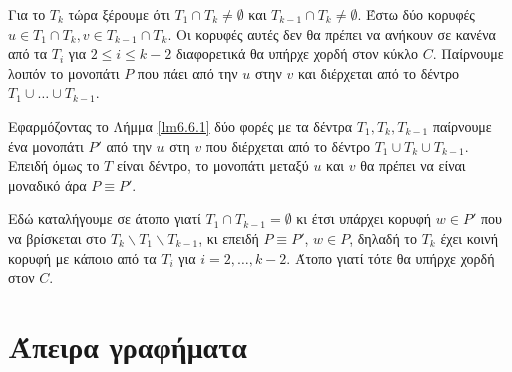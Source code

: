 \documentclass[a4paper, oneside, 11pt]{article}
\theoremstyle{definition}
\begin{document}
\begin{enumerate}
   Για το $T_k$ τώρα ξέρουμε ότι $T_1 \cap T_k \neq \emptyset$
   και $T_{k-1} \cap T_{k} \neq \emptyset$. Έστω δύο κορυφές
   $u \in T_1 \cap T_{k}, v \in T_{k-1} \cap T_k$. Οι κορυφές αυτές
   δεν θα πρέπει να ανήκουν σε κανένα από τα $T_i$ για $2 \leq i \leq k-2$
   διαφορετικά θα υπήρχε χορδή στον κύκλο $C$. Παίρνουμε λοιπόν
   το μονοπάτι $P$ που πάει από την $u$ στην $v$ και διέρχεται από
   το δέντρο $T_1 \cup \ldots \cup T_{k-1}$.

   Εφαρμόζοντας το Λήμμα \ref{lm6.6.1} δύο φορές με τα δέντρα
   $T_1, T_k, T_{k-1}$ παίρνουμε ένα μονοπάτι $P'$ από την $u$
   στη $v$ που διέρχεται από το δέντρο $T_1 \cup T_k \cup T_{k-1}$.
   Επειδή όμως το $T$ είναι δέντρο, το μονοπάτι μεταξύ $u$ και
   $v$ θα πρέπει να είναι μοναδικό άρα $P \equiv P'$.

   Εδώ καταλήγουμε σε άτοπο γιατί $T_1 \cap T_{k-1} = \emptyset$ κι έτσι
   υπάρχει κορυφή $w \in P'$ που να βρίσκεται στο $T_k \backslash T_1
   \backslash T_{k-1}$, κι επειδή $P \equiv P'$,
   $w \in P$, δηλαδή το $T_k$ έχει κοινή κορυφή με κάποιο από τα
   $T_i$ για $i = 2, \ldots, k-2$. Άτοπο γιατί τότε θα υπήρχε χορδή
   στον $C$.
\end{enumerate}

\section{Άπειρα γραφήματα}
\end{document}

